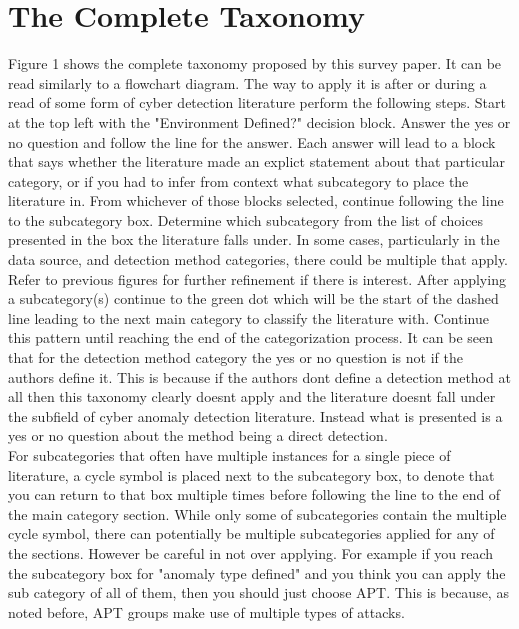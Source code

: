 \documentclass[10pt]{IEEEtran}
\begin{document}
\section{The Complete Taxonomy}
Figure 1 shows the complete taxonomy proposed by this survey paper. It can be read similarly to a flowchart diagram. The way to apply it is after or during a read of some form of cyber detection literature perform the following steps. Start at the top left with the "Environment Defined?" decision block. Answer the yes or no question and follow the line for the answer. Each answer will lead to a block that says whether the literature made an explict statement about that particular category, or if you had to infer from context what subcategory to place the literature in. From whichever of those blocks selected, continue following the line to the subcategory box. Determine which subcategory from the list of choices presented in the box the literature falls under. In some cases, particularly in the data source, and detection method categories, there could be multiple that apply. Refer to previous figures for further refinement if there is interest. After applying a subcategory(s) continue to the green dot which will be the start of the dashed line leading to the next main category to classify the literature with. Continue this pattern until reaching the end of the categorization process. It can be seen that for the detection method category the yes or no question is not if the authors define it. This is because if the authors dont define a detection method at all then this taxonomy clearly doesnt apply and the literature doesnt fall under the subfield of cyber anomaly detection literature. Instead what is presented is a yes or no question about the method being a direct detection.\\
For subcategories that often have multiple instances for a single piece of literature, a cycle symbol is placed next to the subcategory box, to denote that you can return to that box multiple times before following the line to the end of the main category section. While only some of subcategories contain the multiple cycle symbol, there can potentially be multiple subcategories applied for any of the sections. However be careful in not over applying. For example if you reach the subcategory box for "anomaly type defined" and you think you can apply the sub category of all of them, then you should just choose APT. This is because, as noted before, APT groups make use of multiple types of attacks.
\end{document}
